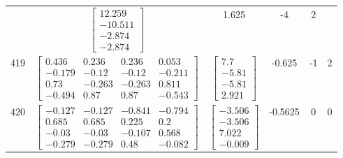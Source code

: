 \documentclass[a4paper,12pt]{article}
\begin{document}
\begin{tabular}{c c c c c c}
&
$\begin{bmatrix} 12.259 \\ -10.511 \\ -2.874 \\ -2.874 \end{bmatrix}$
&
1.625
&
-4
&
2
\\
419
&
$\begin{bmatrix} 0.436 & 0.236 & 0.236 & 0.053 \\ -0.179 & -0.12 & -0.12 & -0.211 \\ 0.73 & -0.263 & -0.263 & 0.811 \\ -0.494 & 0.87 & 0.87 & -0.543 \end{bmatrix}$
&
$\begin{bmatrix} 7.7 \\ -5.81 \\ -5.81 \\ 2.921 \end{bmatrix}$
&
-0.625
&
-1
&
2
\\
420
&
$\begin{bmatrix} -0.127 & -0.127 & -0.841 & -0.794 \\ 0.685 & 0.685 & 0.225 & 0.2 \\ -0.03 & -0.03 & -0.107 & 0.568 \\ -0.279 & -0.279 & 0.48 & -0.082 \end{bmatrix}$
&
$\begin{bmatrix} -3.506 \\ -3.506 \\ 7.022 \\ -0.009 \end{bmatrix}$
&
-0.5625
&
0
&
0
\\
\end{tabular} \egroup \newpage
\end{document}
